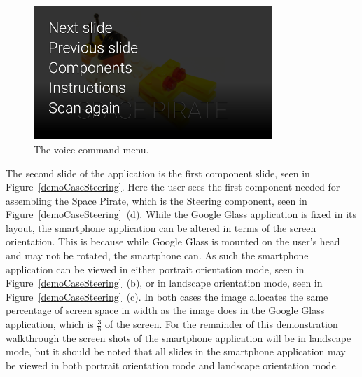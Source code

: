 	\begin{figure}[H]%
		\centering
		\includegraphics[width=90mm]{images/demoCase/glassVoiceCommand}
		\caption{The voice command menu.}
		\label{demoCaseVoiceCommand}
	\end{figure}


The second slide of the application is the first component slide, seen in Figure~\ref{demoCaseSteering}. Here the user sees the first component needed for assembling the Space Pirate, which is the Steering component, seen in Figure~\ref{demoCaseSteering}~(d). While the Google Glass application is fixed in its layout, the smartphone application can be altered in terms of the screen orientation. This is because while Google Glass is mounted on the user's head and may not be rotated, the smartphone can. As such the smartphone application can be viewed in either portrait orientation mode, seen in Figure~\ref{demoCaseSteering}~(b), or in landscape orientation mode, seen in Figure~\ref{demoCaseSteering}~(c). In both cases the image allocates the same percentage of screen space in width as the image does in the Google Glass application, which is \(\frac{3}{8}\) of the screen. For the remainder of this demonstration walkthrough the screen shots of the smartphone application will be in landscape mode, but it should be noted that all slides in the smartphone application may be viewed in both portrait orientation mode and landscape orientation mode.

